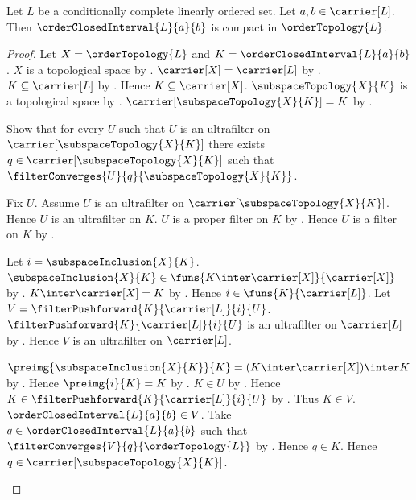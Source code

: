 \begin{theorem}\label{order_closed_interval_is_compact}
    Let $L$ be a conditionally complete linearly ordered set.
    Let $a,b\in\carrier[L]$.
    Then $\orderClosedInterval{L}{a}{b}$ is compact in
        $\orderTopology{L}$.
\end{theorem}
\begin{proof}
    Let $X=\orderTopology{L}$ and
        $K=\orderClosedInterval{L}{a}{b}$.
    $X$ is a topological space by
        .
    $\carrier[X]=\carrier[L]$ by
        .
    $K\subseteq\carrier[L]$ by
        .
    Hence $K\subseteq\carrier[X]$.
    $\subspaceTopology{X}{K}$ is a topological space by
        .
    $\carrier[\subspaceTopology{X}{K}]=K$ by
        .

    Show that for every $U$ such that $U$ is an ultrafilter on
        $\carrier[\subspaceTopology{X}{K}]$ there exists
        $q\in\carrier[\subspaceTopology{X}{K}]$ such that
        $\filterConverges{U}{q}{\subspaceTopology{X}{K}}$.
    \begin{subproof}
        Fix $U$.
        Assume $U$ is an ultrafilter on
            $\carrier[\subspaceTopology{X}{K}]$.
        Hence $U$ is an ultrafilter on $K$.
        $U$ is a proper filter on $K$ by
            .
        Hence $U$ is a filter on $K$ by
            .

        Let $i=\subspaceInclusion{X}{K}$.
        $\subspaceInclusion{X}{K}\in
            \funs{K\inter\carrier[X]}{\carrier[X]}$ by
            .
        $K\inter\carrier[X]=K$ by
            .
        Hence $i\in\funs{K}{\carrier[L]}$.
        Let $V=\filterPushforward{K}{\carrier[L]}{i}{U}$.
        $\filterPushforward{K}{\carrier[L]}{i}{U}$ is an ultrafilter on
            $\carrier[L]$ by
            .
        Hence $V$ is an ultrafilter on $\carrier[L]$.

        $\preimg{\subspaceInclusion{X}{K}}{K}
            =(K\inter\carrier[X])\inter K$ by
            .
        Hence $\preimg{i}{K}=K$ by
            .
        $K\in U$ by .
        Hence $K\in\filterPushforward{K}{\carrier[L]}{i}{U}$ by
            .
        Thus $K\in V$.
        $\orderClosedInterval{L}{a}{b}\in V$.
        Take $q\in\orderClosedInterval{L}{a}{b}$ such that
            $\filterConverges{V}{q}{\orderTopology{L}}$ by
            .
        Hence $q\in K$.
        Hence $q\in\carrier[\subspaceTopology{X}{K}]$.


\end{subproof}
\end{proof}
